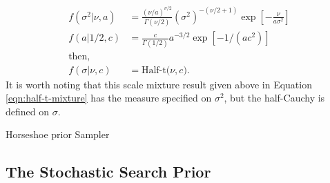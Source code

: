 \begin{align}\label{eqn:half-t-mixture}
f(\sigma^2 \vert \nu, a) & = \frac{ (\nu/a)^{\nu/2} }{ \Gamma(\nu/2) } (\sigma^{2})^{-(\nu/2 +1)}
\exp \left[- \frac{\nu}{a \sigma^2} \right] \\
f(a\vert 1/2,c) & =\frac{c}{\Gamma(1/2)}a^{-3/2}\exp\left[-1/(ac^{2})\right]  \\
\text{then,} & \\
f(\sigma \vert\nu,c) & = \text{Half-t($\nu,c$)}. 
\end{align}  
It is worth noting that this scale mixture result given above in Equation \ref{eqn:half-t-mixture} has the measure specified on $\sigma^2$, but the half-Cauchy is defined on $\sigma$. 
			
	
			\begin{algorithm}[H]
{}
\caption{Horseshoe prior Sampler}\label{psd:horseshoe_prior_sampler}
			\end{algorithm}
		
		\subsection{The Stochastic Search Prior}\label{sec:ssvs_app}

